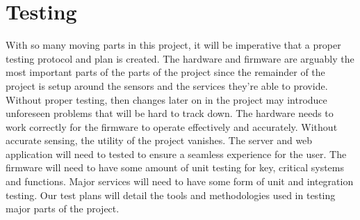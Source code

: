 \section{Testing}
With so many moving parts in this project, it will be imperative that a proper
testing protocol and plan is created. The hardware and firmware are arguably the
most important parts of the parts of the project since the remainder of the
project is setup around the sensors and the services they're able to provide.
Without proper testing, then changes later on in the project may introduce
unforeseen problems that will be hard to track down. The hardware needs to work
correctly for the firmware to operate effectively and accurately. Without
accurate sensing, the utility of the project vanishes. The server and web
application will need to tested to ensure a seamless experience for the user.
The firmware will need to have some amount of unit testing for key, critical
systems and functions. Major services will need to have some form of unit and
integration testing. Our test plans will detail the tools and methodologies used
in testing major parts of the project.


